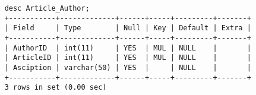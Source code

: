 \documentclass[13pt,a4paper]{report}
\begin{document}
\begin{itemize}
\begin{lstlisting}
	desc Article_Author;
	+-----------+-------------+------+-----+---------+-------+
	| Field     | Type        | Null | Key | Default | Extra |
	+-----------+-------------+------+-----+---------+-------+
	| AuthorID  | int(11)     | YES  | MUL | NULL    |       |
	| ArticleID | int(11)     | YES  | MUL | NULL    |       |
	| Asciption | varchar(50) | YES  |     | NULL    |       |
	+-----------+-------------+------+-----+---------+-------+
	3 rows in set (0.00 sec)

\end{lstlisting}

\end{itemize}
\end{document}
